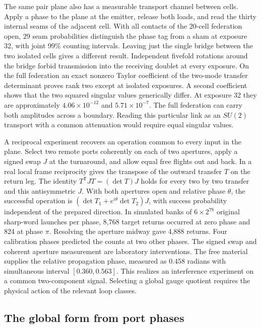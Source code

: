 \documentclass[11pt]{article}
\begin{document}
The same pair plane also has a measurable transport channel between
cells. Apply a phase to the plane at the emitter, release both loads,
and read the thirty internal seams of the adjacent cell. With all
contacts of the 20-cell federation open, 29 seam probabilities
distinguish the phase tag from a sham at exposure 32, with joint
99\% counting intervals. Leaving just the single bridge between the
two isolated cells gives a different result. Independent fivefold
rotations around the bridge forbid transmission into the receiving
doublet at every exposure. On the full federation an exact nonzero
Taylor coefficient of the two-mode transfer determinant proves rank
two except at isolated exposures. A second coefficient shows that the
two squared singular values generically differ. At exposure 32 they
are approximately \(4.06\times10^{-12}\) and \(5.71\times10^{-7}\).
The full federation can carry both amplitudes across a boundary.
Reading this particular link as an \(SU(2)\) transport with a common
attenuation would require equal singular values.

A reciprocal experiment recovers an operation common to every input
in the plane. Select two remote ports coherently on each of two
apertures, apply a signed swap \(J\) at the turnaround, and allow equal
free flights out and back. In a real local frame reciprocity gives
the transpose of the outward transfer \(T\) on the return leg.
The identity \(T^{\mathsf T}JT=(\det T)J\) holds for every two by two
transfer and this antisymmetric \(J\). With both apertures open and
relative phase \(\theta\), the successful operation is
\((\det T_1+e^{i\theta}\det T_2)J\), with success probability
independent of the prepared direction. In simulated banks of
\(6\times2^{78}\) original sharp-word launches per phase, 8,768
target returns occurred at zero phase and 824 at phase \(\pi\).
Resolving the aperture midway gave 4,888 returns. Four calibration
phases predicted the counts at two other phases. The signed swap and
coherent aperture measurement are laboratory interventions. The free
material supplies the relative propagation phase, measured as
\(0.458\) radians with simultaneous interval \([0.360,0.563]\).
This realizes an interference experiment on a common two-component
signal. Selecting a global gauge quotient requires the physical action
of the relevant loop classes.

\subsection{The global form from port phases}
\label{sec:global-form-port-phases}
\end{document}
